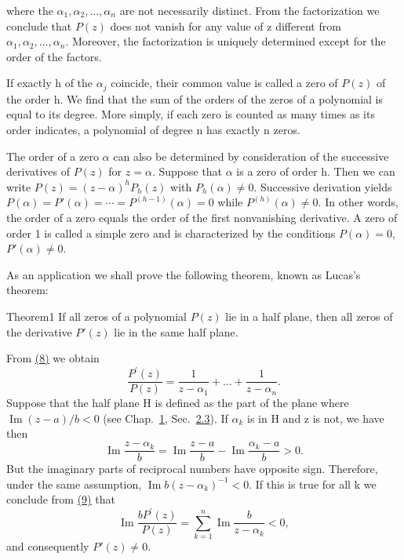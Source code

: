 where the $\alpha_{1}, \alpha_{2}, \ldots, \alpha_{n}$ are not necessarily distinct. From the factorization we conclude that $P(z)$ does not vanish for any value of z different from $\alpha_{1}, \alpha_{2}, \ldots, \alpha_{n}$. Moreover, the factorization is uniquely determined except for the order of the factors.

If exactly h of the $\alpha_{j}$ coincide, their common value is called a zero of $P(z)$ of the order h. We find that the sum of the orders of the zeros of a polynomial is equal to its degree. More simply, if each zero is counted as many times as its order indicates, a polynomial of degree n has exactly n zeros.

The order of a zero $\alpha$ can also be determined by consideration of the successive derivatives of $P(z)$ for $z = \alpha$. Suppose that $\alpha$ is a zero of order h. Then we can write $P(z) = (z - \alpha)^{h}P_{h}(z)$ with $P_{h}(\alpha) \neq 0$. Successive derivation yields $P(\alpha) = P'(\alpha) = \cdots = P^{(h-1)}(\alpha) = 0$ while $P^{(h)}(\alpha) \neq 0$. In other words, the order of a zero equals the order of the first nonvanishing derivative. A zero of order 1 is called a simple zero and is characterized by the conditions $P(\alpha) = 0$, $P'(\alpha) \neq 0$.

As an application we shall prove the following theorem, known as Lucas's theorem:

\begin{originalstatement}{Theorem}{1}\label{thm:2.1}
If all zeros of a polynomial $P(z)$ lie in a half plane, then all zeros of the derivative $P'(z)$ lie in the same half plane.
\end{originalstatement}
From \hyperref[eq:2.8]{(8)} we obtain
\begin{equation*}
\frac {P ^ {\prime} (z)}{P (z)} = \frac {1}{z - \alpha_ {1}} + \dots + \frac {1}{z - \alpha_ {n}}.\tag{9}\label{eq:2.9}
\end{equation*}
Suppose that the half plane H is defined as the part of the plane where $\operatorname{Im}(z-a)/b<0$ (see Chap.~\hyperref[chap:1]{1}, Sec.~\hyperref[sec:1.2.3]{2.3}). If $\alpha_{k}$ is in H and z is not, we have then
\begin{equation*}
\operatorname{Im} \frac {z - \alpha_ {k}}{b} = \operatorname{Im} \frac {z - a}{b} - \operatorname{Im} \frac {\alpha_ {k} - a}{b} > 0.
\end{equation*}
But the imaginary parts of reciprocal numbers have opposite sign. Therefore, under the same assumption, $\operatorname{Im} b(z - \alpha_{k})^{-1} < 0$. If this is true for all k we conclude from \hyperref[eq:2.9]{(9)} that
\begin{equation*}
\operatorname{Im} \frac {b P ^ {\prime} (z)}{P (z)} = \sum_ {k = 1} ^ {n} \operatorname{Im} \frac {b}{z - \alpha_ {k}} <   0,
\end{equation*}
and consequently $P'(z) \neq 0$.

